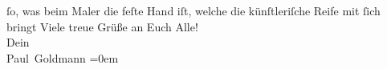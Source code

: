                ſo, was beim Maler die feſte Hand iſt, welche die künſtleriſche Reife mit ſich
               bringt{\dotstwo}\textcolor{gray}{{\dotstwo}}\pend
           \pstart
           Viele treue Grüße an Euch Alle! {\\[\baselineskip]}Dein {\\[\baselineskip]}\spacefill\mbox{Paul Goldmann}\pend
           \leftskip=0em{}\endnumbering{}  
      